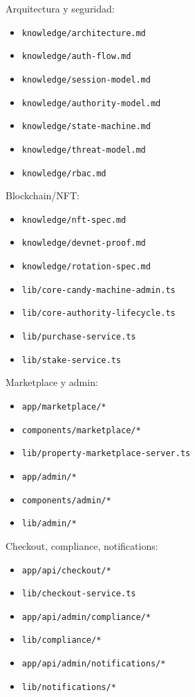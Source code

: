 \documentclass[
  10pt,
  letterpaper,
]{article}
\providecommand{\tightlist}{%
  \setlength{\itemsep}{0pt}\setlength{\parskip}{0pt}}
\let\oldtexttt\texttt
\renewcommand{\texttt}[1]{\oldtexttt{\small #1}}
\begin{document}
Arquitectura y seguridad:

\begin{itemize}
\tightlist
\item
  \texttt{knowledge/architecture.md}
\item
  \texttt{knowledge/auth-flow.md}
\item
  \texttt{knowledge/session-model.md}
\item
  \texttt{knowledge/authority-model.md}
\item
  \texttt{knowledge/state-machine.md}
\item
  \texttt{knowledge/threat-model.md}
\item
  \texttt{knowledge/rbac.md}
\end{itemize}

Blockchain/NFT:

\begin{itemize}
\tightlist
\item
  \texttt{knowledge/nft-spec.md}
\item
  \texttt{knowledge/devnet-proof.md}
\item
  \texttt{knowledge/rotation-spec.md}
\item
  \texttt{lib/core-candy-machine-admin.ts}
\item
  \texttt{lib/core-authority-lifecycle.ts}
\item
  \texttt{lib/purchase-service.ts}
\item
  \texttt{lib/stake-service.ts}
\end{itemize}

Marketplace y admin:

\begin{itemize}
\tightlist
\item
  \texttt{app/marketplace/*}
\item
  \texttt{components/marketplace/*}
\item
  \texttt{lib/property-marketplace-server.ts}
\item
  \texttt{app/admin/*}
\item
  \texttt{components/admin/*}
\item
  \texttt{lib/admin/*}
\end{itemize}

Checkout, compliance, notifications:

\begin{itemize}
\tightlist
\item
  \texttt{app/api/checkout/*}
\item
  \texttt{lib/checkout-service.ts}
\item
  \texttt{app/api/admin/compliance/*}
\item
  \texttt{lib/compliance/*}
\item
  \texttt{app/api/admin/notifications/*}
\item
  \texttt{lib/notifications/*}
\end{itemize}
\end{document}
